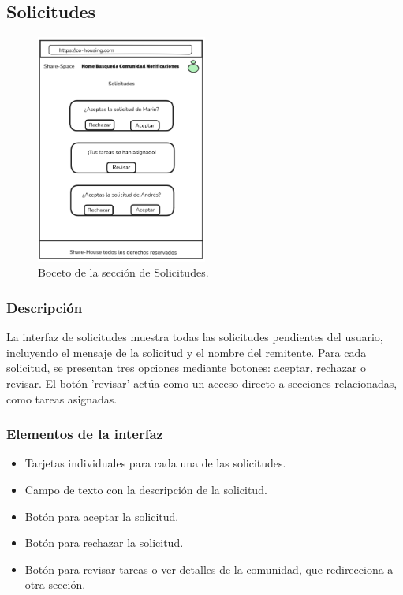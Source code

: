 \subsection{Solicitudes}
\begin{figure}[H]
    \centering
    \includegraphics[width=0.5\textwidth]{fotos/Solicitudes-boceto.png}
    \caption{Boceto de la sección de Solicitudes.}
    \label{fig:solicitudes}
\end{figure}
\subsubsection{Descripción}
La interfaz de solicitudes muestra todas las solicitudes pendientes del usuario, incluyendo el mensaje de la solicitud y el nombre del remitente. Para cada solicitud, se presentan tres opciones mediante botones: aceptar, rechazar o revisar. El botón 'revisar' actúa como un acceso directo a secciones relacionadas, como tareas asignadas.

\subsubsection{Elementos de la interfaz}
\begin{itemize}
  \item Tarjetas individuales para cada una de las solicitudes.
  \item Campo de texto con la descripción de la solicitud.
  \item Botón para aceptar la solicitud.
  \item Botón para rechazar la solicitud.
  \item Botón para revisar tareas o ver detalles de la comunidad, que redirecciona a otra sección.
\end{itemize}

